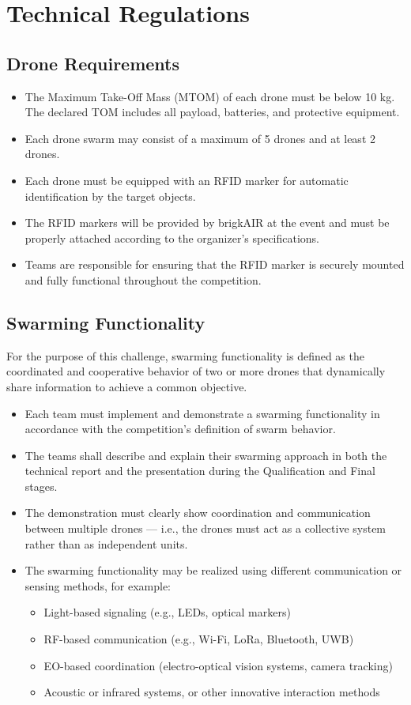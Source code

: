
\section{Technical Regulations}

\subsection{Drone Requirements}
\begin{itemize}
	\item{The Maximum Take-Off Mass (MTOM) of each drone must be below 10 kg. The declared TOM includes all payload, batteries, and protective equipment.}
	\item{Each drone swarm may consist of a maximum of 5 drones and at least 2 drones.}
	\item{Each drone must be equipped with an RFID marker for automatic identification by the target objects.}
	\item{The RFID markers will be provided by brigkAIR at the event and must be properly attached according to the organizer's specifications.}
	\item{Teams are responsible for ensuring that the RFID marker is securely mounted and fully functional throughout the competition.}
\end{itemize}

\subsection{Swarming Functionality}
For the purpose of this challenge, swarming functionality is defined as the coordinated and cooperative behavior of two or more drones that dynamically share information to achieve a common objective.
\begin{itemize}
	\item{Each team must implement and demonstrate a swarming functionality in accordance with the competition's definition of swarm behavior.}
	\item{The teams shall describe and explain their swarming approach in both the technical report and the presentation during the Qualification and Final stages.}
	\item{The demonstration must clearly show coordination and communication between multiple drones — i.e., the drones must act as a collective system rather than as independent units.}
	\item{The swarming functionality may be realized using different communication or sensing methods, for example:}
	\begin{itemize}[label=--]
		\item{Light-based signaling (e.g., LEDs, optical markers)}
		\item{RF-based communication (e.g., Wi-Fi, LoRa, Bluetooth, UWB)}
		\item{EO-based coordination (electro-optical vision systems, camera tracking)}
		\item{Acoustic or infrared systems, or other innovative interaction methods}
	\end{itemize}
\end{itemize}

